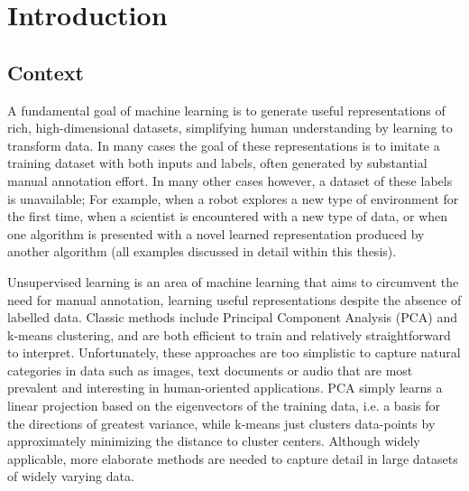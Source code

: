 \chapter{Introduction} \label{ch:intro}

\section{Context}
A fundamental goal of machine learning is to generate useful representations of rich, high-dimensional datasets, simplifying human understanding by learning to transform data. In many cases the goal of these representations is to imitate a training dataset with both inputs and labels, often generated by substantial manual annotation effort.
In many other cases however, a dataset of these labels is unavailable; For example, when a robot explores a new type of environment for the first time, when a scientist is encountered with a new type of data, or when one algorithm is presented with a novel learned representation produced by another algorithm (all examples discussed in detail within this thesis).

Unsupervised learning is an area of machine learning that aims to circumvent the need for manual annotation, learning useful representations despite the absence of labelled data. Classic methods include Principal Component Analysis (PCA) and k-means clustering, and are both efficient to train and relatively straightforward to interpret. Unfortunately, these approaches are too simplistic to capture natural categories in data such as images, text documents or audio that are most prevalent and interesting in human-oriented applications. PCA simply learns a linear projection based on the eigenvectors of the training data, i.e. a basis for the directions of greatest variance, while k-means just clusters data-points by approximately minimizing the distance to cluster centers. Although widely applicable, more elaborate methods are needed to capture detail in large datasets of widely varying data.

